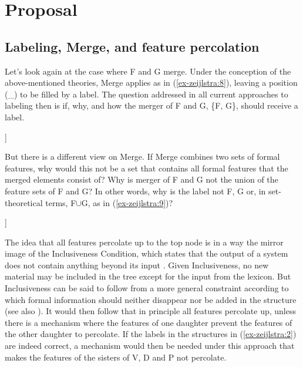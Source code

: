 \documentclass[output=paper
,modfonts
,nonflat]{langsci/langscibook}
\begin{document}
\section{Proposal}
\subsection{Labeling, Merge, and feature percolation}
Let’s look again at the case where F and G merge. Under the conception of the above-mentioned theories, Merge applies as in (\ref{ex-zeijlstra:8}), leaving a position (\_) to be filled by a label. The question addressed in all current approaches to labeling then is if, why, and how the merger of F and G, \{F, G\}, should receive a label.

	\begin{exe}
		\ex\label{ex-zeijlstra:8}
		\begin{forest}	
			[\_
			[F]
			[G] ]
		\end{forest}
	\end{exe}
But there is a different view on Merge. If Merge combines two sets of formal features, why would this not be a set that contains all formal features that the merged elements consist of? Why is merger of F and G not the union of the feature sets of F and G? In other words, why is the label not F, G or, in set-theoretical terms, F$\cup$G, as in (\ref{ex-zeijlstra:9})?

	\begin{exe}
		\ex\label{ex-zeijlstra:9}\begin{forest}	
			[F$\cup$G
			[F]
			[G]]
		\end{forest}
	\end{exe}
\noindent The idea that all features percolate up to the top node is in a way the mirror image of the Inclusiveness Condition, which states that the output of a system does not contain anything beyond its input \citep[225]{Chomsky1995}. Given Inclusiveness, no new material may be included in the tree except for the input from the lexicon. But Inclusiveness can be said to follow from a more general constraint according to which formal information should neither disappear nor be added in the structure (see also \citealt{Neeleman_VanDerKoot2002}). It would then follow that in principle all features percolate up, unless there is a mechanism where the features of one daughter prevent the features of the other daughter to percolate. If the labels in the structures in (\ref{ex-zeijlstra:2}) are indeed correct, a mechanism would then be needed under this approach that makes the features of the sisters of V, D and P not percolate. 
\end{document}
